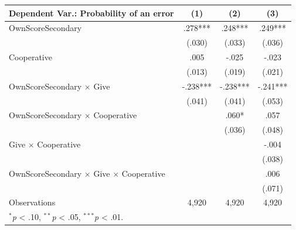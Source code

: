 \begingroup
\centering
\begin{tabular*}{\linewidth}{@{\extracolsep{\fill}}lccc}
   \toprule
   Dependent Var.: Probability of an error & \multicolumn{1}{c}{(1)} & \multicolumn{1}{c}{(2)} & \multicolumn{1}{c}{(3)}\\
   \midrule
   OwnScoreSecondary & \mbox{\hphantom{8}.278***} & \mbox{\hphantom{8}.248***} & \mbox{\hphantom{8}.249***}\\
    & \mbox{(.030)\hphantom{88}} & \mbox{(.033)\hphantom{88}} & \mbox{(.036)\hphantom{88}}\\
   Cooperative & \mbox{\hphantom{8}.005\hphantom{888}} & \mbox{-.025\hphantom{888}} & \mbox{-.023\hphantom{888}}\\
    & \mbox{(.013)\hphantom{88}} & \mbox{(.019)\hphantom{88}} & \mbox{(.021)\hphantom{88}}\\
   OwnScoreSecondary $\times$ Give & \mbox{-.238***} & \mbox{-.238***} & \mbox{-.241***}\\
    & \mbox{(.041)\hphantom{88}} & \mbox{(.041)\hphantom{88}} & \mbox{(.053)\hphantom{88}}\\
   OwnScoreSecondary $\times$ Cooperative &  & \mbox{\hphantom{8}.060*\hphantom{88}} & \mbox{\hphantom{8}.057\hphantom{888}}\\
    &  & \mbox{(.036)\hphantom{88}} & \mbox{(.048)\hphantom{88}}\\
   Give $\times$ Cooperative &  &  & \mbox{-.004\hphantom{888}}\\
    &  &  & \mbox{(.038)\hphantom{88}}\\
   OwnScoreSecondary $\times$ Give $\times$ Cooperative &  &  & \mbox{\hphantom{8}.006\hphantom{888}}\\
    &  &  & \mbox{(.071)\hphantom{88}}\\
   \midrule
   Observations & 4,920 & 4,920 & 4,920\\
   \multicolumn{4}{l}{\footnotesize $^{*}$\textit{p} < .10, $^{**}$\textit{p} < .05, $^{***}$\textit{p} < .01.}\\
   \bottomrule
\end{tabular*}
\par\endgroup
